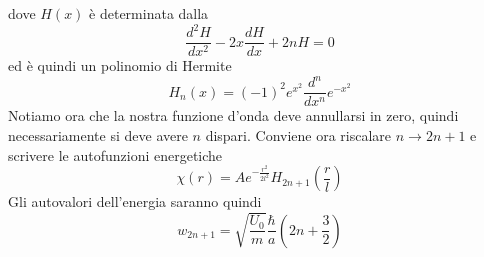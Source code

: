 \documentclass[a4paper]{article}
\begin{document}
        dove $H(x)$ è determinata dalla
        \begin{equation*}
            \frac{d^2H}{dx^2}-2x\frac{dH}{dx}+2nH=0
        \end{equation*}
        ed è quindi un polinomio di Hermite
        \begin{equation*}
            H_n(x)=(-1)^2e^{x^2}\frac{d^n}{dx^n}e^{-x^2}
        \end{equation*}
        Notiamo ora che la nostra funzione d'onda deve annullarsi in zero, quindi necessariamente si deve avere $n$ dispari.
        Conviene ora riscalare $n\to 2n+1$ e scrivere le autofunzioni energetiche
        \begin{equation*}
            \chi(r)=Ae^{-\frac{r^2}{2l^2}}H_{2n+1}\left(\frac{r}{l}\right)
        \end{equation*}
        Gli autovalori dell'energia saranno quindi
        \begin{equation*}
            w_{2n+1}=\sqrt{\frac{U_0}{m}}\frac{\hbar}{a}\left(2n+\frac{3}{2}\right)
        \end{equation*}
\end{document}
